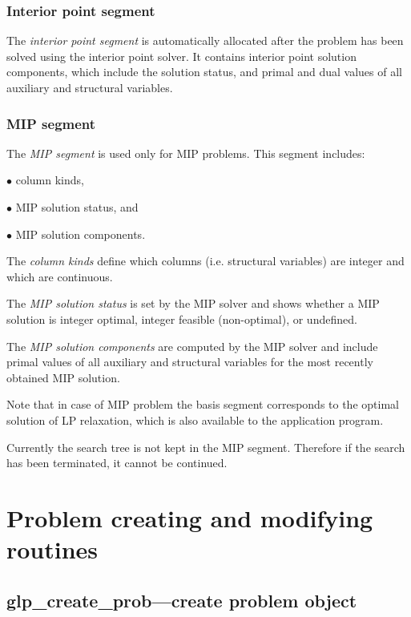 \subsubsection*{Interior point segment}

The {\it interior point segment} is automatically allocated after the
problem has been solved using the interior point solver. It contains
interior point solution components, which include the solution status,
and primal and dual values of all auxiliary and structural variables.

\subsubsection*{MIP segment}

The {\it MIP segment} is used only for MIP problems. This segment
includes:

$\bullet$ column kinds,

$\bullet$ MIP solution status, and

$\bullet$ MIP solution components.

The {\it column kinds} define which columns (i.e. structural variables)
are integer and which are continuous.

The {\it MIP solution status} is set by the MIP solver and shows whether
a MIP solution is integer optimal, integer feasible (non-optimal), or
undefined.

The {\it MIP solution components} are computed by the MIP solver and
include primal values of all auxiliary and structural variables for the
most recently obtained MIP solution.

Note that in case of MIP problem the basis segment corresponds to
the optimal solution of LP relaxation, which is also available to the
application program.

Currently the search tree is not kept in the MIP segment. Therefore if
the search has been terminated, it cannot be continued.


\newpage

\section{Problem creating and modifying routines}

\subsection{glp\_create\_prob---create problem object}

